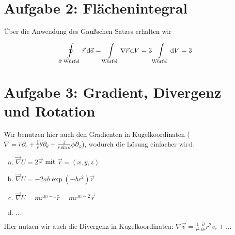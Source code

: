 \documentclass[a4paper,german,12pt,smallheadings]{scrartcl}
\begin{document}
\section*{Aufgabe 2: Flächenintegral}

Über die Anwendung des Gaußschen Satzes erhalten wir

\begin{equation}
  \oint\limits_\text{$\partial$ Würfel} \vec{r} \dif \vec{a} = \int\limits_\text{Würfel} \nabla \vec{r} \dif V = 3 \int\limits_\text{Würfel} \dif V = 3
\end{equation}

\section*{Aufgabe 3: Gradient, Divergenz und Rotation}

Wir benutzen hier auch den Gradienten in Kugelkoordinaten ($\nabla = \hat{r}
\partial_r + \frac{1}{r} \hat{\theta} \partial_\theta + \frac{1}{r \sin \theta}
\hat{\phi} \partial_\phi$), wodurch die Lösung einfacher wird.

\begin{enumerate}[a)]
  \item $\vec{\nabla} U = 2 \vec{r}$ mit $\vec{r} = (x,y,z)$
  \item $\vec{\nabla} U = -2ab \exp(-br^2) \vec{r}$
  \item $\vec{\nabla} U = mr^{m-1} \hat{r} = mr^{m-2} \vec{r}$
  \item $\dots$
\end{enumerate}


Hier nutzen wir auch die Divergenz in Kugelkoordinaten: $\nabla \vec{v} = \frac{1}{r^2} \frac{\partial}{\partial r} r^2 v_r + \dots$
\end{document}
